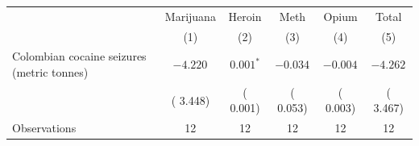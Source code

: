 \begin{tabular}{l c c c c c}
\hline\hline
 & Marijuana & Heroin & Meth & Opium & Total \\
 & (1) & (2) & (3) & (4) & (5) \\
\hline
Colombian cocaine seizures (metric tonnes)
 & $-4.220^{}$ & $ 0.001^{*}$ & $-0.034^{}$ & $-0.004^{}$ & $-4.262^{}$  \\
 & ( 3.448) & ( 0.001) & ( 0.053) & ( 0.003) & ( 3.467)  \\
\hline
\hline
Observations
 & 12 & 12 & 12 & 12 & 12 \\
\hline\hline
\end{tabular}
